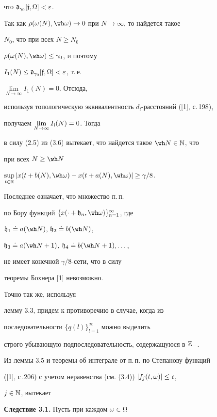 что $\frak d_{\gamma_0}[\frak f,\Omega]<\varepsilon$.


Так как $\rho(\omega(N),\wh\omega)\to 0$ при $N\to\infty$, то найдется такое


$N_{0}$, что при всех $N\ge N_0$\;


$\rho(\omega(N),\wh\omega)\le\gamma_{0}$, и поэтому


$I_1(N)\le\frak d_{\gamma_0}[\frak f,\Omega]<\varepsilon$, т.\,е.


$\lim\limits_{N\to\infty}I_1(N)=0$. Отсюда,


используя топологическую эквивалентность $d_l$-расстояний ([1], с.\,198),


получаем $\lim\limits_{N\to\infty}I_{\frak l}(N)=0$. Тогда 


в силу (2.5) из (3.6) вытекает, что найдется такое $\wh N\in \Bbb N$, что


при всех $N\ge\wh N$\;


$\sup\limits_{t\in\Bbb R}|x(t+b(N),\wh\omega)-x(t+a(N),\wh\omega)|


\ge\gamma/8$.


Последнее означает, что множество п.\,п.


по Бору функций $\{x(\cdot+\gh_n,\wh\omega)\}_{n=1}^{\infty}$, где


$\gh_1\doteq a(\wh N)$, $\gh_2\doteq b(\wh N)$,


$\gh_3\doteq a(\wh N+1)$, $\gh_4\doteq b(\wh N+1),\dotsc$,


не имеет конечной $\gamma/8$-сети, что в силу


теоремы Бохнера [1] невозможно.


Точно так же, используя


лемму 3.3, придем к противоречию в случае, когда из


последовательности $\{q(l)\}_{l=1}^{\infty}$ можно выделить


строго убывающую подпоследовательность, содержащуюся в $\Bbb Z_-$.





Из леммы 3.5 и теоремы об интеграле от п.\,п. по Степанову функций


([1], с\,.206) с учетом неравенства (см. (3.4)) $|f_j(t,\omega)|\le\frak c$,


$j\in\Bbb N$, вытекает


\medskip





{\bf Следствие 3.1.} Пусть при каждом $\omega\in\Omega$\;


